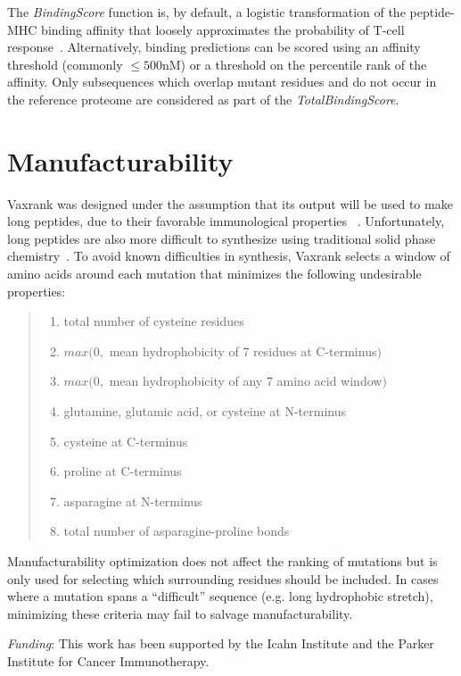 \documentclass[10pt,letterpaper]{article}
\begin{document}
The {\it BindingScore} function is, by default, a logistic transformation of the peptide-MHC binding affinity that loosely approximates the probability of T-cell response~\citep{Sette1994}. Alternatively, binding predictions can be scored using an affinity threshold (commonly $\leq 500$nM) or a threshold on the percentile rank of the affinity. Only subsequences which overlap mutant residues and do not occur in the reference proteome are considered as part of the {\it TotalBindingScore}.

\section{Manufacturability}
Vaxrank was designed under the assumption that its output will be used to make long peptides, due to their favorable immunological properties ~\citep{synthetic-long-peptides}. Unfortunately, long peptides are also more difficult to synthesize using traditional solid phase chemistry~\citep{PeptideChemistry}. To avoid known difficulties in synthesis, Vaxrank selects a window of amino acids around each mutation that minimizes the following undesirable properties:

\begin{quote}
\begin{enumerate}
	\item total number of cysteine residues
	\item $max(0, $ mean hydrophobicity of 7 residues at C-terminus$)$
	\item $max(0, $ mean hydrophobicity of any 7 amino acid window$)$
	\item glutamine, glutamic acid, or cysteine at N-terminus
	\item cysteine at C-terminus
	\item proline at C-terminus
	\item asparagine at N-terminus
	\item total number of asparagine-proline bonds
\end{enumerate}
\end{quote}
Manufacturability optimization does not affect the ranking of mutations but is only used for selecting which surrounding residues should be included.  In cases where a mutation  spans a ``difficult'' sequence (e.g. long hydrophobic stretch), minimizing these criteria  may fail to salvage manufacturability.

{\it Funding}: This work has been supported by the Icahn Institute and the Parker Institute for Cancer Immunotherapy.
\end{document}
